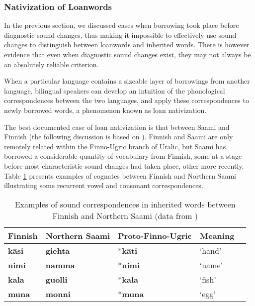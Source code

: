 \documentclass[svgnames,12pt]{scrartcl}
\newcommand{\ipa}[1]{\textbf{{\phon\mbox{#1}}}}
\begin{document}
\subsubsection{Nativization of Loanwords}
In the previous section, we discussed cases when borrowing took place before diagnostic sound changes, thus making it impossible to effectively use sound changes to distinguish between loanwords and inherited words. There is however evidence that even when diagnostic sound changes exist, they may not always be an absolutely reliable criterion.

When a particular language contains a sizeable layer of borrowings from another language, bilingual speakers can develop an intuition of the phonological correspondences between the two languages, and apply these correspondences to newly borrowed words, a phenomenon known as loan nativization.

The best documented case of loan nativization is that between Saami and Finnish (the following discussion is based on \citealt{aikio06nativization}). Finnish and Saami are only remotely related within the Finno-Ugric branch of Uralic, but  Saami has borrowed a considerable quantity of vocabulary from Finnish, some at a stage before most characteristic sound changes had taken place, other more recently. Table \ref{tab:native} presents examples of cognates between Finnish and Northern Saami illustrating some recurrent vowel and consonant correspondences.

\begin{table}[h]
\caption{Examples of sound correspondences in inherited words between Finnish and Northern Saami (data from \citealt[27]{aikio06nativization})} \centering \label{tab:native}
\begin{tabular}{lllll}
\toprule
Finnish & Northern Saami & Proto-Finno-Ugric & Meaning \\
\midrule
\ipa{käsi} & \ipa{giehta} & *\ipa{käti} & `hand' \\
\ipa{nimi} & \ipa{namma} & *\ipa{nimi} & `name' \\
\ipa{kala} & \ipa{guolli} & *\ipa{kala} & `fish' \\
\ipa{muna} & \ipa{monni} & *\ipa{muna} & `egg' \\
\bottomrule
\end{tabular}
\end{table}
\end{document}
